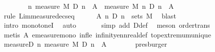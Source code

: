 \begin{isabellebody}
\ \ \isamarkupfalse%
\isanewline
\ \ \isamarkupfalse%
\ \isamarkupfalse%
\ {\isachardoublequoteopen}{\isacharparenleft}{\kern0pt}{\isasymlambda}n{\isachardot}{\kern0pt}\ measure\ M\ {\isacharparenleft}{\kern0pt}D\ n\ {\isasyminter}\ A{\isacharparenright}{\kern0pt}{\isacharparenright}{\kern0pt}\ {\isasymlonglonglongrightarrow}\ measure\ M\ {\isacharparenleft}{\kern0pt}{\isasymInter}n{\isachardot}{\kern0pt}\ D\ n\ {\isasyminter}\ A{\isacharparenright}{\kern0pt}{\isachardoublequoteclose}\isanewline
\ \ \ \ \isamarkupfalse%
\ {\isacharparenleft}{\kern0pt}rule\ Lim{\isacharunderscore}{\kern0pt}measure{\isacharunderscore}{\kern0pt}decseq{\isacharparenright}{\kern0pt}\isanewline
\ \ \ \ \isamarkupfalse%
\ A{\isacharparenleft}{\kern0pt}{}{\isacharparenright}{\kern0pt}\ {\isacartoucheopen}{\isasymAnd}n{\isachardot}{\kern0pt}\ D\ n\ {\isasymin}\ sets\ M{\isacartoucheclose}\ \isamarkupfalse%
\ blast\isanewline
\ \ \ \ \isamarkupfalse%
\ {\isacharparenleft}{\kern0pt}intro\ monotoneI{\isacharparenright}{\kern0pt}\ \isamarkupfalse%
\ auto{\isacharbrackleft}{\kern0pt}{}{\isacharbrackright}{\kern0pt}\isanewline
\ \ \ \ \ \isamarkupfalse%
\ {\isacharparenleft}{\kern0pt}simp\ add{\isacharcolon}{\kern0pt}\ D{\isacharunderscore}{\kern0pt}def{\isacharparenright}{\kern0pt}\ \isamarkupfalse%
\ {\isacharparenleft}{\kern0pt}meson\ order{\isacharunderscore}{\kern0pt}trans{\isacharparenright}{\kern0pt}\isanewline
\ \ \ \ \isamarkupfalse%
\ {\isacharparenleft}{\kern0pt}metis\ A\ emeasure{\isacharunderscore}{\kern0pt}mono\ inf{\isacharunderscore}{\kern0pt}le{}\ infinity{\isacharunderscore}{\kern0pt}ennreal{\isacharunderscore}{\kern0pt}def\ top{\isachardot}{\kern0pt}extremum{\isacharunderscore}{\kern0pt}unique{\isacharparenright}{\kern0pt}\isanewline
\ \ \ \ \isamarkupfalse%
\isanewline
\ \ \isamarkupfalse%
\ \isamarkupfalse%
\ measure{\isacharunderscore}{\kern0pt}D{\isacharunderscore}{\kern0pt}{}{\isacharcolon}{\kern0pt}\ {\isachardoublequoteopen}{\isacharparenleft}{\kern0pt}{\isasymlambda}n{\isachardot}{\kern0pt}\ measure\ M\ {\isacharparenleft}{\kern0pt}D\ n\ {\isasyminter}\ A{\isacharparenright}{\kern0pt}{\isacharparenright}{\kern0pt}\ {\isasymlonglonglongrightarrow}\ {}{\isachardoublequoteclose}\isanewline
\ \ \ \ \isamarkupfalse%
\ presburger\isanewline

\end{isabellebody}
